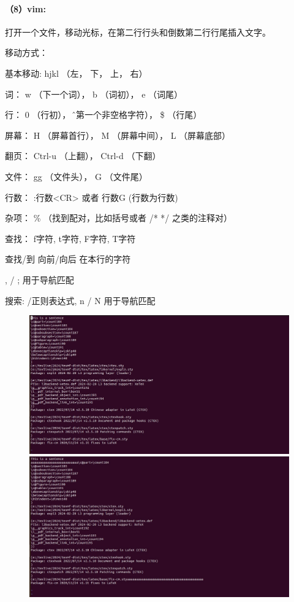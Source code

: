 \documentclass[a4paper, 12pt]{article}
\begin{document}
	\paragraph{（8）vim:}	
	打开一个文件，移动光标，在第二行行头和倒数第二行行尾插入文字。
	
	移动方式：
	
	基本移动: hjkl （左， 下， 上， 右）
	
	词： w （下一个词）， b （词初）， e （词尾）
	
	行： 0 （行初）， \^ （第一个非空格字符）， \$ （行尾）
	
	屏幕： H （屏幕首行）， M （屏幕中间）， L （屏幕底部）
	
	翻页： Ctrl-u （上翻）， Ctrl-d （下翻）
	
	文件： gg （文件头）， G （文件尾）
	
	行数： :{行数}<CR> 或者 {行数}G ({行数}为行数)
	
	杂项： \% （找到配对，比如括号或者 /* */ 之类的注释对）
	
	查找： f{字符}, t{字符}, F{字符}, T{字符}
	
	查找/到 向前/向后 在本行的{字符}
	
	, / ; 用于导航匹配
	
	搜索: /{正则表达式}, n / N 用于导航匹配
	
	\begin{figure}[H]
		\centering
		\includegraphics[width=1\textwidth]{028.jpg}
		\includegraphics[width=1\textwidth]{029.jpg}
	\end{figure}
	
\end{document}
